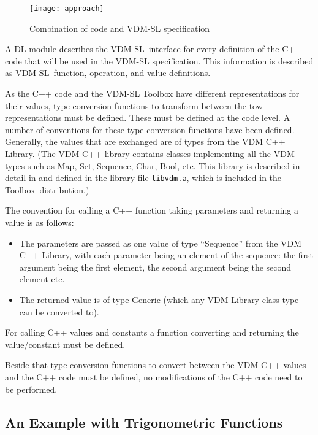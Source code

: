 \documentclass[\pformat,12pt]{article}
\newcommand{\vdmslpp}{VDM-SL}
\newcommand{\Toolbox}{Toolbox}
\begin{document}
 
\begin{figure}
\begin{center}
\resizebox{.55\textwidth}{!}%
{\texttt{[image: approach]}}
\caption{Combination of code and VDM-SL specification\label{idea}}
\end{center}
\end{figure}

A DL module describes the \vdmslpp\ interface for every definition of
the C++ code that will be used in the VDM-SL specification. This
information is described as \vdmslpp\ function, operation, and value
definitions.

As the C++ code and the VDM-SL Toolbox have different
representations for their values, type conversion functions to
transform between the tow representations must be defined. These must
be defined at the code level.  A number of conventions for these type
conversion functions have been defined.  Generally, the values that
are exchanged are of types from the VDM C++ Library. (The VDM C++
library contains classes implementing all the VDM types such as Map,
Set, Sequence, Char, Bool, etc.  This library is described in detail
in \cite{LibMan-SCSK} and defined in the library file {\tt libvdm.a}, which
is included in the \Toolbox\ distribution.)

The convention for calling a C++ function taking parameters and
returning a value is as follows:
\begin{itemize}
\item The parameters are passed as one value of type ``Sequence'' from
  the VDM C++ Library, with each parameter being an element of the
  sequence: the first argument being the first element, the second
  argument being the second element etc.
\item The returned value is of type Generic (which any VDM Library
  class type can be converted to).
\end{itemize}

For calling C++ values and constants a function converting and
returning the value/constant must be defined.

Beside that type conversion functions to convert between the VDM C++
values and the C++ code must be defined, no modifications of the C++
code need to be performed.

 
\subsection{An Example with Trigonometric Functions}
\end{document}

